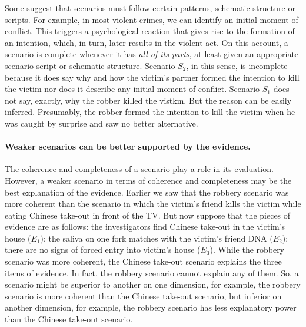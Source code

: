 \documentclass[10pt]{article}
\begin{document}
Some suggest that scenarios must follow certain patterns, 
schematic structure or scripts. For example, in most violent crimes, we can identify an initial 
moment of conflict. This triggers a psychological reaction that gives rise to the formation of an 
intention, which, in turn, later results in the violent act. On this account, a scenario is 
complete whenever it has \textit{all of its parts}, at least given an appropriate 
scenario script or schematic structure. Scenario $S_2$, in this sense, is incomplete 
because it does say why and how the victim's partner formed 
the intention to kill the victim nor does it describe any initial moment of conflict. 
Scenario $S_1$ does not say, exactly, why the robber killed the vistkm. But the reason can be easily inferred. Presumably, 
the robber formed the intention to kill the victim when he was caught by surprise and saw no better alternative. 







\paragraph{Weaker scenarios can be better supported by the evidence.} 

The coherence and completeness of a scenario play a role in its evaluation. However, a weaker scenario in terms of coherence and completeness may be the best explanation of the evidence. Earlier we saw that the robbery scenario was more coherent than the scenario in which the victim's friend kills the victim while eating Chinese take-out in front of the TV. But now suppose that the pieces of evidence are as follows: the investigators find Chinese take-out in the victim's house ($E_1$); the saliva on one fork matches with the victim's friend DNA ($E_2$); there are no signs of forced entry into victim's house ($E_3$). While the robbery scenario was more coherent, the Chinese take-out scenario explains the three items of evidence. In fact, the robbery scenario cannot explain any of them. So, a scenario might be superior to another on one dimension, for example, the robbery scenario is more coherent than the Chinese take-out scenario, but inferior on another dimension, for example, the robbery scenario has less explanatory power than the Chinese take-out scenario. 
\end{document}
